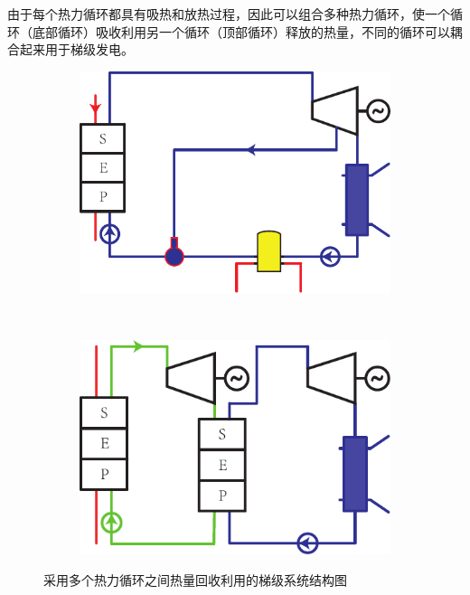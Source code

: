 由于每个热力循环都具有吸热和放热过程，因此可以组合多种热力循环，使一个循环（底部循环）吸收利用另一个循环（顶部循环）释放的热量，不同的循环可以耦合起来用于梯级发电。
\noindent \begin{figure}[htbp]
\centering
	\begin{subfigure}[b]{0.4\columnwidth}
	\includegraphics[width = \columnwidth]{fig/Stirling-Rankine}
	\caption{}\label{fig:Stirling-Rankine}
	\end{subfigure}
	~
\begin{subfigure}[b]{0.4\columnwidth}
	\includegraphics[width = \columnwidth]{fig/SeriesRankine}
	\caption{}\label{fig:Rankine-Rankine}
	\end{subfigure}
	\caption{采用多个热力循环之间热量回收利用的梯级系统结构图}
	\label{fig:coupledCycles}
\end{figure}

